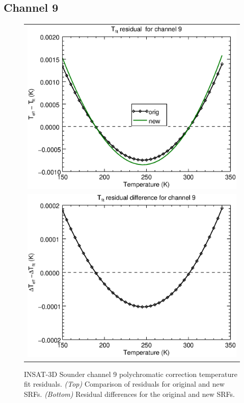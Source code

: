 \subsection{Channel 9}
\begin{figure}[H]
  \centering
  \begin{tabular}{c}
    \includegraphics[scale=0.55]{graphics/sndr/tfit/sndr_insat3d-9.tfit.eps} \\
    \includegraphics[scale=0.55]{graphics/sndr/tfit/sndr_insat3d-9.tfit.difference.eps}
  \end{tabular}
  \caption{INSAT-3D Sounder channel 9 polychromatic correction temperature fit residuals. \emph{(Top)} Comparison of residuals for original and new SRFs. \emph{(Bottom)} Residual differences for the original and new SRFs.}
  \label{fig:sndr_ch9_tfit}
\end{figure}

